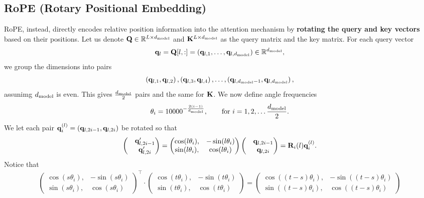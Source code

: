\documentclass[11pt]{article}  %
\begin{document}
\subsection{RoPE (Rotary Positional Embedding)}
RoPE, instead, directly encodes relative position information into the attention mechanism by \textbf{rotating the query and key vectors} based on their positions.
Let us denote $\mathbf{Q} \in \mathbb{R}^{L \times d_{\text{model}}}$ and $\mathbf{K}^{L \times d_{\text{model}}}$ as the query matrix and the key matrix.
For each query vector 
\begin{align}
  \mathbf{q}_l = \mathbf{Q}[l, :] = \left( \mathbf{q}_{l,1}, \hdots, \mathbf{q}_{l,d_{\text{model}}} \right) \in \mathbb{R}^{d_{\text{model}}}, 
\end{align}
we group the dimensions into pairs 
\begin{align}
  \left( \mathbf{q}_{l,1}, \mathbf{q}_{l,2} \right), \left( \mathbf{q}_{l,3}, \mathbf{q}_{l,4} \right), \hdots, \left( \mathbf{q}_{l,d_{\text{model}} - 1}, \mathbf{q}_{l, d_{\text{model}}} \right),
\end{align}
assunimg $d_{\text{model}}$ is even.
This gives $\frac{d_{\text{model}}}{2}$ pairs and the same for $\mathbf{K}$.
We now define angle frequencies 
\begin{align*}
  \theta_i = 10000^{-\frac{2(i - 1)}{d_{\text{model}}}}, \qquad \text{for } i = 1,2, \hdots \frac{d_{\text{model}}}{2}.
\end{align*}
We let each pair $\mathbf{q}_i^{(l)} = (\mathbf{q}_{l, 2i - 1}, \mathbf{q}_{l, 2i})$ be rotated so that 
\begin{align*}
  \begin{pmatrix}
    &\mathbf{q}_{l, 2i-1}^\prime \\
    &\mathbf{q}_{l, 2i}^\prime
  \end{pmatrix}
  = \begin{pmatrix}
    \cos(l\theta_i), & -\sin(l\theta_i) \\
    \sin(l\theta_i), & \cos(l\theta_i)
  \end{pmatrix}
  \begin{pmatrix}
    &\mathbf{q}_{l, 2i-1} \\
    &\mathbf{q}_{l, 2i}
  \end{pmatrix} = \mathbf{R}_i(l) \mathbf{q}_i^{(l)}.
\end{align*}
Notice that 
\begin{align*}
  \begin{pmatrix}
    \cos(s\theta_i), & -\sin(s\theta_i) \\
    \sin(s\theta_i), & \cos(s\theta_i)
  \end{pmatrix}^{\top} \cdot \begin{pmatrix}
    \cos(t\theta_i), & -\sin(t\theta_i) \\
    \sin(t\theta_i), & \cos(t\theta_i)
  \end{pmatrix} = \begin{pmatrix}
    \cos((t-s)\theta_i), & -\sin((t-s)\theta_i) \\
    \sin((t-s)\theta_i), & \cos((t-s)\theta_i)
  \end{pmatrix}
\end{align*}
\end{document}
